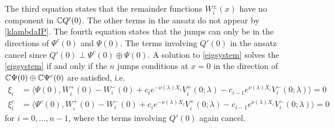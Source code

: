 \documentclass[10pt,reqno]{amsart}
\theoremstyle{plain}
\theoremstyle{definition}
\theoremstyle{remark}
\numberwithin{theorem}{section}
\numberwithin{equation}{section}
\begin{document}
The third equation states that the remainder functions $W_i^\pm(x)$ have no component in $\mathbb{C} Q'(0)$. The other terms in the ansatz do not appear by \cref{klambdaIP}. The fourth equation states that the jumps can only be in the directions of $\Psi^c(0)$ and $\Psi(0)$. The terms involving $Q'(0)$ in the ansatz cancel since $Q'(0) \perp \Psi^c(0)\oplus\Psi(0)$. A solution to \eqref{eigsystem} solves the \cref{eigsystem} if and only if the $n$ jumps conditions at $x = 0$ in the direction of $\mathbb{C} \Psi(0) \oplus \mathbb{C} \Psi^c(0)$ are satisfied, i.e.  
\begin{equation}\label{jumpxi1}
\begin{aligned}
\xi_i &= \langle \Psi(0), W_i^+(0) - W_i^-(0) + c_i e^{-\nu(\lambda)X_i}V_i^+(0; \lambda) - c_{i-1} e^{\nu(\lambda)X_i} V_i^-(0; \lambda) \rangle = 0  \\
\xi_i^c &= \langle \Psi^c(0), W_i^+(0) - W_i^-(0) + c_i e^{-\nu(\lambda)X_i}V_i^+(0; \lambda) - c_{i-1} e^{\nu(\lambda)X_i} V_i^-(0; \lambda) \rangle = 0 
\end{aligned}
\end{equation}
for $i = 0, \dots, n-1$, where the terms involving $Q'(0)$ again cancel.
\end{document}
